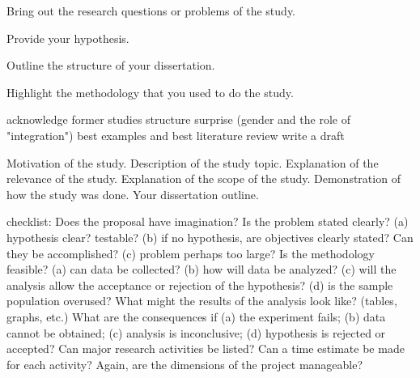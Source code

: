 Bring out the research questions or problems of the study.

Provide your hypothesis.

Outline the structure of your dissertation.

Highlight the methodology that you used to do the study.


acknowledge former studies
structure
surprise (gender and the role of "integration")
best examples and best literature review
write a draft

Motivation of the study.
Description of the study topic.
Explanation of the relevance of the study.
Explanation of the scope of the study.
Demonstration of how the study was done.
Your dissertation outline.


checklist:
Does the proposal have imagination?
Is the problem stated clearly?
(a) hypothesis clear? testable?
(b) if no hypothesis, are objectives clearly stated? Can they be accomplished?
(c) problem perhaps too large?
Is the methodology feasible?
(a) can data be collected?
(b) how will data be analyzed?
(c) will the analysis allow the acceptance or rejection of the hypothesis?
(d) is the sample population overused?
What might the results of the analysis look like? (tables, graphs, etc.)
What are the consequences if
(a) the experiment fails;
(b) data cannot be obtained;
(c) analysis is inconclusive;
(d) hypothesis is rejected or accepted?
Can major research activities be listed?
Can a time estimate be made for each activity?
Again, are the dimensions of the project manageable?

\todototoc
\listoftodos
